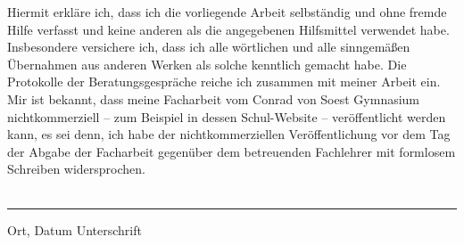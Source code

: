 \documentclass[12pt]{article}
\begin{document}
Hiermit erkläre ich, dass ich die vorliegende Arbeit selbständig und ohne fremde Hilfe
verfasst und keine anderen als die angegebenen Hilfsmittel verwendet habe.
Insbesondere versichere ich, dass ich alle wörtlichen und alle sinngemäßen Übernahmen
aus anderen Werken als solche kenntlich gemacht habe.
Die Protokolle der Beratungsgespräche reiche ich zusammen mit meiner Arbeit ein.
Mir ist bekannt, dass meine Facharbeit vom Conrad von Soest Gymnasium
nichtkommerziell – zum Beispiel in dessen Schul-Website – veröffentlicht werden kann, es
sei denn, ich habe der nichtkommerziellen Veröffentlichung vor dem Tag der Abgabe der
Facharbeit gegenüber dem betreuenden Fachlehrer mit formlosem Schreiben
widersprochen.\\\\
\par\noindent\rule{\textwidth}{0.4pt}
 Ort, Datum Unterschrift
\end{document}
